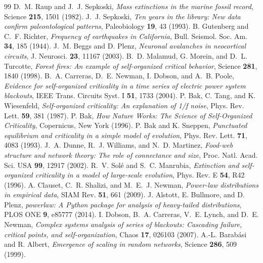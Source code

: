 \documentclass[11pt,a4paper]{article}
\begin{document}
\begin{thebibliography}{99}
 D.~M. Raup and J.~J. Sepkoski, \emph{Mass extinctions in the marine fossil record}, Science \textbf{215}, 1501 (1982).
 J.~J. Sepkoski, \emph{Ten years in the library: New data confirm paleontological patterns}, Paleobiology \textbf{19}, 43 (1993).
 B. Gutenberg and C.~F. Richter, \emph{Frequency of earthquakes in California}, Bull. Seismol. Soc. Am. \textbf{34}, 185 (1944).
 J.~M. Beggs and D. Plenz, \emph{Neuronal avalanches in neocortical circuits}, J. Neurosci. \textbf{23}, 11167 (2003).
 B.~D. Malamud, G. Morein, and D.~L. Turcotte, \emph{Forest fires: An example of self-organized critical behavior}, Science \textbf{281}, 1840 (1998).
 B.~A. Carreras, D.~E. Newman, I. Dobson, and A.~B. Poole, \emph{Evidence for self-organized criticality in a time series of electric power system blackouts}, IEEE Trans. Circuits Syst. I \textbf{51}, 1733 (2004).
 P. Bak, C. Tang, and K. Wiesenfeld, \emph{Self-organized criticality: An explanation of 1/f noise}, Phys. Rev. Lett. \textbf{59}, 381 (1987).
 P. Bak, \emph{How Nature Works: The Science of Self-Organized Criticality}, Copernicus, New York (1996).
 P. Bak and K. Sneppen, \emph{Punctuated equilibrium and criticality in a simple model of evolution}, Phys. Rev. Lett. \textbf{71}, 4083 (1993).
 J.~A. Dunne, R.~J. Williams, and N.~D. Martinez, \emph{Food-web structure and network theory: The role of connectance and size}, Proc. Natl. Acad. Sci. USA \textbf{99}, 12917 (2002).
 R.~V. Sol\'e and S.~C. Manrubia, \emph{Extinction and self-organized criticality in a model of large-scale evolution}, Phys. Rev. E \textbf{54}, R42 (1996).
 A. Clauset, C.~R. Shalizi, and M.~E.~J. Newman, \emph{Power-law distributions in empirical data}, SIAM Rev. \textbf{51}, 661 (2009).
 J. Alstott, E. Bullmore, and D. Plenz, \emph{powerlaw: A Python package for analysis of heavy-tailed distributions}, PLOS ONE \textbf{9}, e85777 (2014).
 I. Dobson, B.~A. Carreras, V.~E. Lynch, and D.~E. Newman, \emph{Complex systems analysis of series of blackouts: Cascading failure, critical points, and self-organization}, Chaos \textbf{17}, 026103 (2007).
 A.-L. Barab\'asi and R. Albert, \emph{Emergence of scaling in random networks}, Science \textbf{286}, 509 (1999).
\end{thebibliography}
\end{document}
